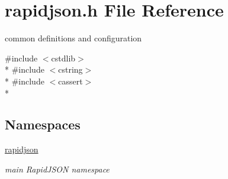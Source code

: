 \hypertarget{a00677}{}\section{rapidjson.\+h File Reference}
\label{a00677}


common definitions and configuration  


{\ttfamily \#include $<$cstdlib$>$}\\*
{\ttfamily \#include $<$cstring$>$}\\*
{\ttfamily \#include $<$cassert$>$}\\*
\subsection*{Namespaces}
\begin{DoxyCompactItemize}
\item 
 \hyperlink{a00826}{rapidjson}
\begin{DoxyCompactList}\small\item\em main Rapid\+J\+S\+ON namespace \end{DoxyCompactList}\end{DoxyCompactItemize}
